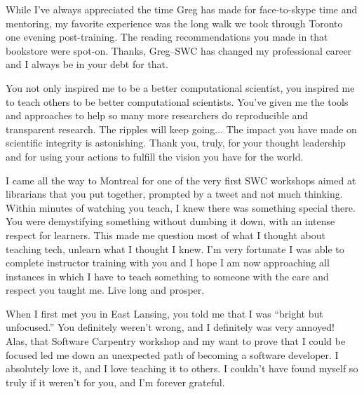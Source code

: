 
\newpage

While I've always appreciated the time Greg has made for face-to-skype time and
mentoring, my favorite experience was the long walk we took through Toronto one
evening post-training.  The reading recommendations you made in that bookstore
were spot-on.  Thanks, Greg--SWC has changed my professional career and I always
be in your debt for that.


\newpage

You not only inspired me to be a better computational scientist, you inspired
me to teach others to be better computational scientists. You've given me the
tools and approaches to help so many more researchers do reproducible and
transparent research. The ripples will keep going... The impact you have made
on scientific integrity is astonishing. Thank you, truly, for your thought
leadership and for using your actions to fulfill the vision you have for the
world. 


\newpage

I came all the way to Montreal for one of the very first SWC workshops aimed at
librarians that you put together, prompted by a tweet and not much thinking.
Within minutes of watching you teach, I knew there was something special there.
You were demystifying something without dumbing it down, with an intense
respect for learners. This made me question most of what I thought about
teaching tech, unlearn what I thought I knew. I'm very fortunate I was able to
complete instructor training with you and I hope I am now approaching all
instances in which I have to teach something to someone with the care and
respect you taught me. Live long and prosper.


\newpage

When I first met you in East Lansing, you told me that I was ``bright but
unfocused.''  You definitely weren't wrong, and I definitely was very annoyed!
Alas, that Software Carpentry workshop and my want to prove that I could be
focused led me down an unexpected path of becoming a software developer.  I
absolutely love it, and I love teaching it to others.  I couldn't have found
myself so truly if it weren't for you, and I'm forever grateful.


